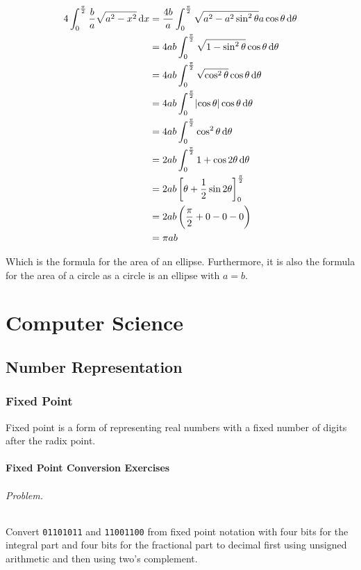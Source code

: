 \documentclass[oneside]{book}
\begin{document}
\begin{align*}
    4 \int_{0}^{\frac{\pi}{2}} \frac{b}{a} \sqrt{a^2 - x^2} \dif x
    &= \frac{4b}{a} \int_{0}^{\frac{\pi}{2}} \sqrt{a^2 - a^2 \sin^2 \theta} a \cos \theta \dif \theta \\
    &= 4ab \int_{0}^{\frac{\pi}{2}} \sqrt{1 - \sin^2 \theta} \cos \theta \dif \theta \\
    &= 4ab \int_{0}^{\frac{\pi}{2}} \sqrt{\cos^2 \theta} \cos \theta \dif \theta \\
    &= 4ab \int_{0}^{\frac{\pi}{2}} \abs{\cos \theta} \cos \theta \dif \theta \\
    &= 4ab \int_{0}^{\frac{\pi}{2}} \cos^2 \theta \dif \theta \\
    &= 2ab \int_{0}^{\frac{\pi}{2}} 1 + \cos {2 \theta} \dif \theta \\
    &= 2ab \left[ \theta + \frac{1}{2} \sin {2 \theta} \right]_{0}^{\frac{\pi}{2}} \\
    &= 2ab \left(\frac{\pi}{2} + 0 - 0 - 0\right) \\
    &= \pi a b
\end{align*}

Which is the formula for the area of an ellipse. Furthermore, it is also the
formula for the area of a circle as a circle is an ellipse with \(a = b\).

\part{Computer Science}

\chapter{Number Representation}

\section{Fixed Point}
Fixed point is a form of representing real numbers with a fixed number of digits
after the radix point.

\subsection{Fixed Point Conversion Exercises}
\paragraph{Problem.}
Convert \texttt{01101011} and \texttt{11001100} from fixed
point notation with four bits for the integral part and four bits for the
fractional part to decimal first using unsigned arithmetic and then using two's
complement.
\end{document}
